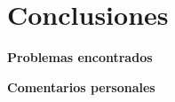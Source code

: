 \documentclass[12pt]{article}
\begin{document}

\newpage
\section{Conclusiones}


\vspace{0.2cm}

\centerline{\textbf{Problemas encontrados}}

\vspace{0.5cm}


\vspace{0.5cm}

\centerline{\textbf{Comentarios personales}}

\vspace{0.5cm}

\end{document}
